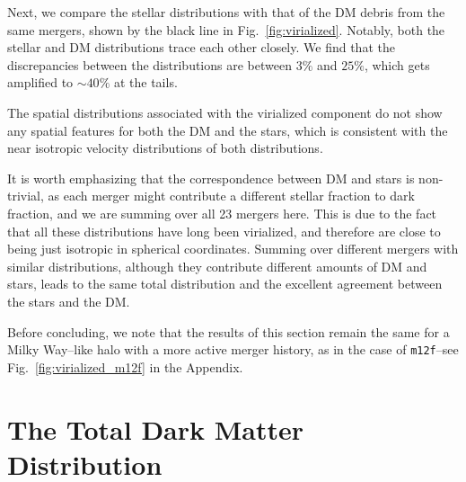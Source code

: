 \documentclass[twocolumn,preprintnumbers]{aastex6}
\DeclareRobustCommand{\Fig}[1]{Fig.~\ref{#1}}
\newcommand{\mf}{\texttt{m12f}}
\begin{document}
Next, we compare the stellar distributions with that of the DM debris from the same mergers, shown by the black line in 
\Fig{fig:virialized}.  Notably, both the stellar and DM distributions trace each other closely. We find that the discrepancies between the distributions are between $3\% $ and $25\%$, which gets amplified to $\sim 40\%$ at the tails. 

The spatial distributions associated with the virialized component do not show any spatial features for both the DM and the stars, which is consistent with the near isotropic velocity distributions of both distributions.

It is worth emphasizing that the correspondence between DM and stars is non-trivial, as each merger might contribute a different stellar fraction to dark fraction, and we are summing over all 23 mergers here.  This is due to the fact that all these distributions have long been virialized, and therefore are close to being just isotropic in spherical coordinates. Summing over different mergers with similar distributions, although they contribute different amounts of DM and stars, leads to the same total distribution and the excellent agreement between the stars and the DM.

Before concluding, we note that the results of this section remain the same for a Milky Way--like halo with a more active merger history, as in the case of \mf--see \Fig{fig:virialized_m12f} in the Appendix.


\section{The Total Dark Matter Distribution}
\label{sec:totaldarkmatter}
\end{document}
